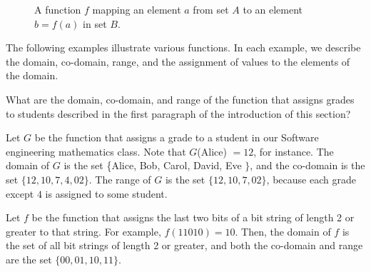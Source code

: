 \begin{figure}[h]
\centering
{}
\caption{A function \(f\) mapping an element \(a\) from set \(A\) to an element \(b=f(a)\) in set \(B\).}
\label{fig:function_mapping}
\end{figure}

The following examples illustrate various functions. In each example, we describe the domain, co-domain, range, and the assignment of values to the elements of the domain.

\begin{example} What are the domain, co-domain, and range of the function that assigns grades to students described in the first paragraph of the introduction of this section?

\begin{solution}
    Let $G$ be the function that assigns a grade to a student in our Software engineering mathematics class. Note that $G$(Alice) $=12$, for instance. The domain of $G$ is the set \{Alice, Bob, Carol, David, Eve $\}$, and the co-domain is the set $\{12, 10, 7, 4, 02\}$. The range of $G$ is the set $\{12, 10, 7, 02\}$, because each grade except $4$ is assigned to some student.
\end{solution}
    
\end{example}

\begin{example}
    Let $f$ be the function that assigns the last two bits of a bit string of length 2 or greater to that string. For example, $f(11010)=10$. Then, the domain of $f$ is the set of all bit strings of length 2 or greater, and both the co-domain and range are the set $\{00,01,10,11\}$.
\end{example}

